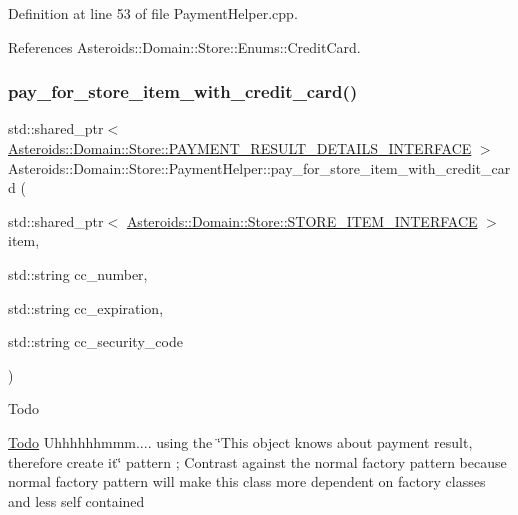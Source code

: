 Definition at line 53 of file Payment\+Helper.\+cpp.



References Asteroids\+::\+Domain\+::\+Store\+::\+Enums\+::\+Credit\+Card.

\mbox{\label{classAsteroids_1_1Domain_1_1Store_1_1PaymentHelper_a603cc23e44e6e3f760f05c3657bf81c5}} 
\subsubsection{\texorpdfstring{pay\+\_\+for\+\_\+store\+\_\+item\+\_\+with\+\_\+credit\+\_\+card()}{pay\_for\_store\_item\_with\_credit\_card()}}
{\footnotesize\ttfamily std\+::shared\+\_\+ptr$<$ \hyperlink{classAsteroids_1_1Domain_1_1Store_1_1PAYMENT__RESULT__DETAILS__INTERFACE}{Asteroids\+::\+Domain\+::\+Store\+::\+P\+A\+Y\+M\+E\+N\+T\+\_\+\+R\+E\+S\+U\+L\+T\+\_\+\+D\+E\+T\+A\+I\+L\+S\+\_\+\+I\+N\+T\+E\+R\+F\+A\+CE} $>$ Asteroids\+::\+Domain\+::\+Store\+::\+Payment\+Helper\+::pay\+\_\+for\+\_\+store\+\_\+item\+\_\+with\+\_\+credit\+\_\+card (\begin{DoxyParamCaption}\item[{std\+::shared\+\_\+ptr$<$ \hyperlink{classAsteroids_1_1Domain_1_1Store_1_1STORE__ITEM__INTERFACE}{Asteroids\+::\+Domain\+::\+Store\+::\+S\+T\+O\+R\+E\+\_\+\+I\+T\+E\+M\+\_\+\+I\+N\+T\+E\+R\+F\+A\+CE} $>$}]{item,  }\item[{std\+::string}]{cc\+\_\+number,  }\item[{std\+::string}]{cc\+\_\+expiration,  }\item[{std\+::string}]{cc\+\_\+security\+\_\+code }\end{DoxyParamCaption})\hspace{0.3cm}{\ttfamily [virtual]}}

\begin{DoxyRefDesc}{Todo}
\item[\hyperlink{todo__todo000014}{Todo}]Uhhhhhhmmm.... using the \char`\"{}\+This object knows about payment result, therefore create it\char`\"{} pattern ; Contrast against the normal factory pattern because normal factory pattern will make this class more dependent on factory classes and less self contained \end{DoxyRefDesc}


